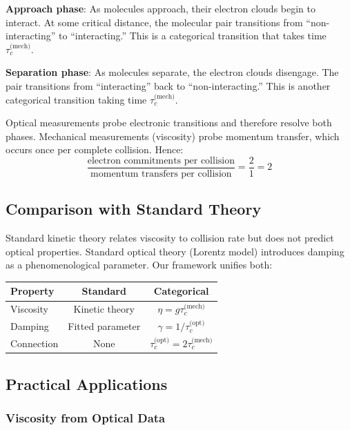\documentclass[twocolumn,10pt]{article}
\theoremstyle{definition}
\theoremstyle{remark}
\begin{document}
\textbf{Approach phase}: As molecules approach, their electron clouds begin to interact. At some critical distance, the molecular pair transitions from ``non-interacting'' to ``interacting.'' This is a categorical transition that takes time $\tau_c^{\text{(mech)}}$.

\textbf{Separation phase}: As molecules separate, the electron clouds disengage. The pair transitions from ``interacting'' back to ``non-interacting.'' This is another categorical transition taking time $\tau_c^{\text{(mech)}}$.

Optical measurements probe electronic transitions and therefore resolve both phases. Mechanical measurements (viscosity) probe momentum transfer, which occurs once per complete collision. Hence:
\begin{equation}
\frac{\text{electron commitments per collision}}{\text{momentum transfers per collision}} = \frac{2}{1} = 2
\end{equation}

\subsection{Comparison with Standard Theory}

Standard kinetic theory relates viscosity to collision rate but does not predict optical properties. Standard optical theory (Lorentz model) introduces damping as a phenomenological parameter. Our framework unifies both:

\begin{center}
\begin{tabular}{lcc}
\toprule
\textbf{Property} & \textbf{Standard} & \textbf{Categorical} \\
\midrule
Viscosity & Kinetic theory & $\eta = g \tau_c^{\text{(mech)}}$ \\
Damping & Fitted parameter & $\gamma = 1/\tau_c^{\text{(opt)}}$ \\
Connection & None & $\tau_c^{\text{(opt)}} = 2\tau_c^{\text{(mech)}}$ \\
\bottomrule
\end{tabular}
\end{center}

\subsection{Practical Applications}

\subsubsection{Viscosity from Optical Data}
\end{document}
